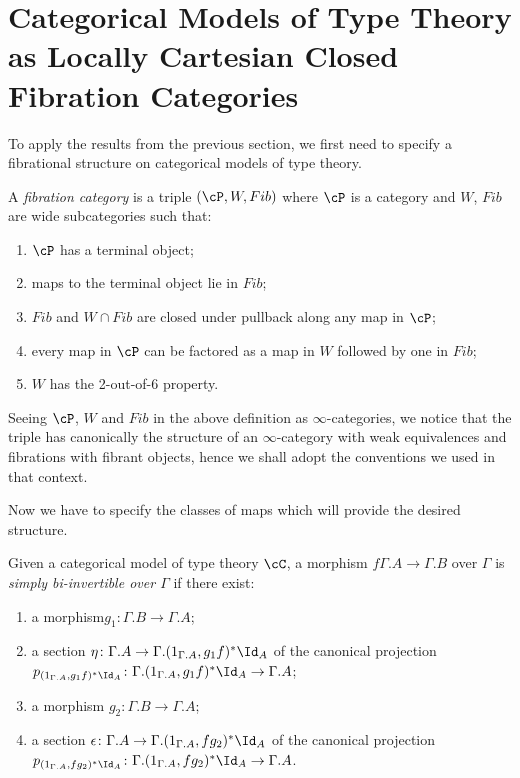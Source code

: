 \chapter*{Categorical Models of Type Theory as Locally Cartesian Closed Fibration Categories}

To apply the results from the previous section, we first need to specify a
fibrational structure on categorical models of type theory.

\begin{defn}
  A \emph{fibration category} is a triple $(\cP,W,Fib)$ where $\cP$ is a
  category and $W$, $Fib$ are wide subcategories such that:
  \begin{enumerate}
    \item $\cP$ has a terminal object;
    \item maps to the terminal object lie in $Fib$;
    \item $Fib$ and $W\cap Fib$ are closed under pullback along any map in $\cP$;
    \item every map in $\cP$ can be factored as a map in $W$ followed by one in
      $Fib$;
    \item $W$ has the 2-out-of-6 property.
  \end{enumerate}
\end{defn}

\begin{rmk}
  Seeing $\cP$, $W$ and $Fib$ in the above definition as $\infty$-categories, we
  notice that the triple has canonically the structure of an $\infty$-category
  with weak equivalences and fibrations with fibrant objects, hence we shall
  adopt the conventions we used in that context.
\end{rmk}

Now we have to specify the classes of maps which will provide the desired
structure.

\begin{defn}
  Given a categorical model of type theory $\cC$, a morphism
  $f\Gamma.A\rightarrow\Gamma.B$ over $\Gamma$ is \emph{simply bi-invertible
  over $\Gamma$} if there exist:
  \begin{enumerate}
    \item a morphism$g_1\colon\Gamma.B\rightarrow\Gamma.A$;
    \item a section $\eta\colon\Gamma.A\rightarrow\Gamma.(1_{\Gamma.A},g_1f)^*\Id_{A}$
      of the canonical projection
      $p_{(1_{\Gamma.A},g_1f)^*\Id_{A}}\colon
      \Gamma.(1_{\Gamma.A},g_1f)^*\Id_{A}\rightarrow\Gamma.A$;
    \item a morphism $g_2\colon\Gamma.B\rightarrow\Gamma.A$;
    \item a section
      $\epsilon\colon\Gamma.A\rightarrow\Gamma.(1_{\Gamma.A},fg_2)^*\Id_{A}$ of
      the canonical projection
      $p_{(1_{\Gamma.A},fg_2)^*\Id_{A}}\colon
      \Gamma.(1_{\Gamma.A},fg_2)^*\Id_{A}\rightarrow\Gamma.A$.
  \end{enumerate}
\end{defn}

